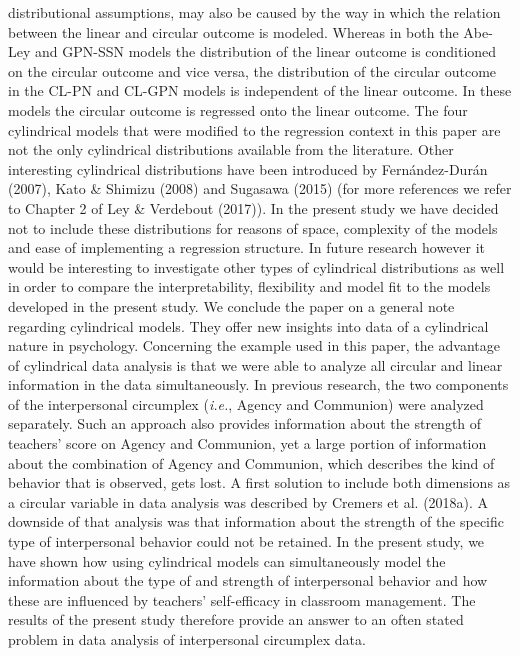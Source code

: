 \documentclass[12pt,]{article}
\begin{document}
distributional assumptions, may also be caused by the way in which the
relation between the linear and circular outcome is modeled. Whereas in
both the Abe-Ley and GPN-SSN models the distribution of the linear
outcome is conditioned on the circular outcome and vice versa, the
distribution of the circular outcome in the CL-PN and CL-GPN models is
independent of the linear outcome. In these models the circular outcome
is regressed onto the linear outcome.\newline
\indent The four cylindrical models that were modified to the regression
context in this paper are not the only cylindrical distributions
available from the literature. Other interesting cylindrical
distributions have been introduced by Fernández-Durán (2007), Kato \&
Shimizu (2008) and Sugasawa (2015) (for more references we refer to
Chapter 2 of Ley \& Verdebout (2017)). In the present study we have
decided not to include these distributions for reasons of space,
complexity of the models and ease of implementing a regression
structure. In future research however it would be interesting to
investigate other types of cylindrical distributions as well in order to
compare the interpretability, flexibility and model fit to the models
developed in the present study.\newline
\indent We conclude the paper on a general note regarding cylindrical
models. They offer new insights into data of a cylindrical nature in
psychology. Concerning the example used in this paper, the advantage of
cylindrical data analysis is that we were able to analyze all circular
and linear information in the data simultaneously. In previous research,
the two components of the interpersonal circumplex (\emph{i.e.}, Agency
and Communion) were analyzed separately. Such an approach also provides
information about the strength of teachers' score on Agency and
Communion, yet a large portion of information about the combination of
Agency and Communion, which describes the kind of behavior that is
observed, gets lost. A first solution to include both dimensions as a
circular variable in data analysis was described by Cremers et al.
(2018a). A downside of that analysis was that information about the
strength of the specific type of interpersonal behavior could not be
retained. In the present study, we have shown how using cylindrical
models can simultaneously model the information about the type of and
strength of interpersonal behavior and how these are influenced by
teachers' self-efficacy in classroom management. The results of the
present study therefore provide an answer to an often stated problem in
data analysis of interpersonal circumplex data.
\end{document}
